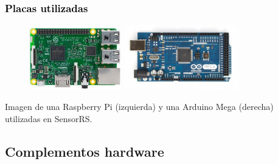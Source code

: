 \documentclass[xcolor=x11names,compress]{beamer}
\theoremstyle{cuadrado}
\begin{document}
\begin{frame}[fragile]
\frametitle{\textcolor{black}{Placas utilizadas}}

\begin{figure}%
    \centering
    \includegraphics[width=4cm]{raspberry-pi.jpg}
    \qquad
    \includegraphics[width=5cm]{arduino.png}
\end{figure}

\begin{center}
  Imagen de una Raspberry Pi (izquierda) y una Arduino Mega (derecha) utilizadas en SensorRS.
\end{center}
 
\end{frame}


\subsection{Complementos hardware}
\end{document}

